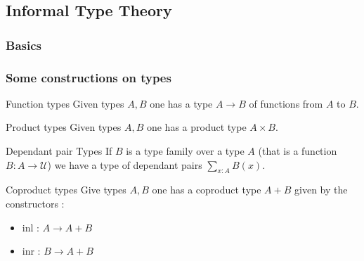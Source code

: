 \documentclass{beamer}
\begin{document}
    \subsection{Informal Type Theory}
        \subsubsection{Basics}
        \begin{frame}
            \frametitle{Some constructions on types}
            \begin{exampleblock}{Function types}
                Given types $A,B$ one has a type $A \rightarrow B$ of functions from $A$ to $B$.
            \end{exampleblock}
            \pause
            \begin{exampleblock}{Product types}
                Given types $A,B$ one has a product type $A \times B$. 
            \end{exampleblock}
            \pause
            \begin{exampleblock}{Dependant pair Types}
                If $B$ is a type family over a type $A$ (that is a function $B : A \rightarrow \mathcal{U}$) we have a type of dependant pairs $\sum_{x : A} B(x) $.
            \end{exampleblock}
            \pause
            \begin{exampleblock}{Coproduct types}
                Give types $A,B$ one has a coproduct type $A+B$ given by the constructors :
                \begin{itemize}
                    \item inl : $A \rightarrow A+B$
                    \item inr : $B \rightarrow A+B$
                  \end{itemize}
            \end{exampleblock}
        \end{frame}
\end{document}
